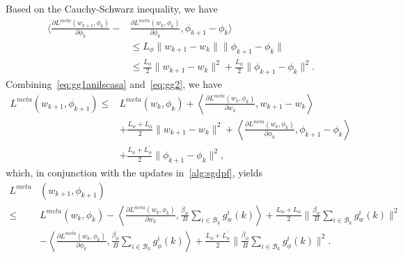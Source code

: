 \documentclass{osudissert96}
\begin{document}
Based on the Cauchy-Schwarz inequality, we have 
\begin{align}\label{eq:gg2}
\Big\langle \frac{\partial L^{meta}(w_{k+1},\phi_k)}{\partial \phi_k}-&\frac{\partial L^{meta}(w_{k},\phi_k)}{\partial \phi_k}, \phi_{k+1}-\phi_k  \Big\rangle  \nonumber
\\&\leq  L_\phi\|w_{k+1}-w_k\|\|\phi_{k+1}-\phi_k\|\nonumber
\\&\leq  \frac{L_\phi}{2}\|w_{k+1}-w_k\|^2 + \frac{L_\phi}{2}\|\phi_{k+1}-\phi_k\|^2.
\end{align}
Combining~\cref{eq:gg1anilscasa} and~\cref{eq:gg2}, we have   
\begin{align*}
L^{meta}(w_{k+1},\phi_{k+1}) \leq&  L^{meta}(w_k,\phi_k) + \left\langle \frac{\partial L^{meta}(w_k,\phi_k)}{\partial w_k}, w_{k+1}-w_k  \right\rangle  \nonumber
\\ &+ \frac{L_w+L_\phi }{2}\|w_{k+1}-w_k\|^2+\left\langle \frac{\partial L^{meta}(w_{k},\phi_k)}{\partial \phi_k}, \phi_{k+1}-\phi_k  \right\rangle  \nonumber
\\&+ \frac{L_\phi+L_\phi^\prime}{2}\|\phi_{k+1}-\phi_k\|^2,  \nonumber
\end{align*}
which, in conjunction with the updates in~\cref{alg:sgdpf}, yields 
\begin{align}\label{eq:wellplay}
L^{meta}&(w_{k+1},\phi_{k+1}) \nonumber
\\\leq&  L^{meta}(w_k,\phi_k) - \left\langle \frac{\partial L^{meta}(w_k,\phi_k)}{\partial w_k}, \frac{\beta_w}{B}\sum_{i\in\mathcal{B}_k} g_{w}^i (k) \right\rangle + \frac{L_w+L_\phi }{2} \Big\| \frac{\beta_w}{B}\sum_{i\in\mathcal{B}_k} g_{w}^i (k)\Big\|^2 \nonumber
\\ &-\left\langle \frac{\partial L^{meta}(w_{k},\phi_k)}{\partial \phi_k},\frac{\beta_\phi}{B}\sum_{i\in\mathcal{B}_k}g_{\phi}^i(k)  \right\rangle + \frac{L_\phi+L_\phi^\prime}{2} \Big\|\frac{\beta_\phi}{B}\sum_{i\in\mathcal{B}_k}g_{\phi}^i(k)\Big\|^2.
\end{align}
\end{document}
